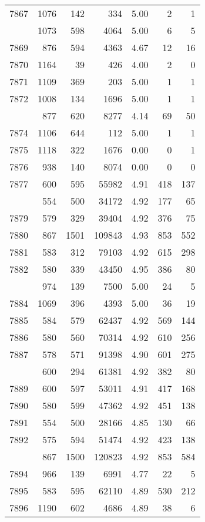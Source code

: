 \documentclass[
]{article}
\begin{document}
\begin{table}
\begin{tabular}[t]{lrrrrrr}
7867 & 1076 & 142 & 334 & 5.00 & 2 & 1\\
\addlinespace
7868 & 1073 & 598 & 4064 & 5.00 & 6 & 5\\
7869 & 876 & 594 & 4363 & 4.67 & 12 & 16\\
7870 & 1164 & 39 & 426 & 4.00 & 2 & 0\\
7871 & 1109 & 369 & 203 & 5.00 & 1 & 1\\
7872 & 1008 & 134 & 1696 & 5.00 & 1 & 1\\
\addlinespace
7873 & 877 & 620 & 8277 & 4.14 & 69 & 50\\
7874 & 1106 & 644 & 112 & 5.00 & 1 & 1\\
7875 & 1118 & 322 & 1676 & 0.00 & 0 & 1\\
7876 & 938 & 140 & 8074 & 0.00 & 0 & 0\\
7877 & 600 & 595 & 55982 & 4.91 & 418 & 137\\
\addlinespace
7878 & 554 & 500 & 34172 & 4.92 & 177 & 65\\
7879 & 579 & 329 & 39404 & 4.92 & 376 & 75\\
7880 & 867 & 1501 & 109843 & 4.93 & 853 & 552\\
7881 & 583 & 312 & 79103 & 4.92 & 615 & 298\\
7882 & 580 & 339 & 43450 & 4.95 & 386 & 80\\
\addlinespace
7883 & 974 & 139 & 7500 & 5.00 & 24 & 5\\
7884 & 1069 & 396 & 4393 & 5.00 & 36 & 19\\
7885 & 584 & 579 & 62437 & 4.92 & 569 & 144\\
7886 & 580 & 560 & 70314 & 4.92 & 610 & 256\\
7887 & 578 & 571 & 91398 & 4.90 & 601 & 275\\
\addlinespace
7888 & 600 & 294 & 61381 & 4.92 & 382 & 80\\
7889 & 600 & 597 & 53011 & 4.91 & 417 & 168\\
7890 & 580 & 599 & 47362 & 4.92 & 451 & 138\\
7891 & 554 & 500 & 28166 & 4.85 & 130 & 66\\
7892 & 575 & 594 & 51474 & 4.92 & 423 & 138\\
\addlinespace
7893 & 867 & 1500 & 120823 & 4.92 & 853 & 584\\
7894 & 966 & 139 & 6991 & 4.77 & 22 & 5\\
7895 & 583 & 595 & 62110 & 4.89 & 530 & 212\\
7896 & 1190 & 602 & 4686 & 4.89 & 38 & 6\\

\end{tabular}
\end{table}
\end{document}
